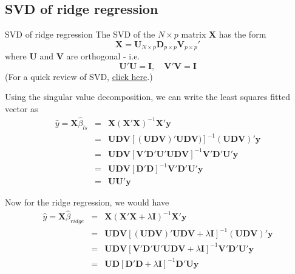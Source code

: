 \documentclass{beamer}
\newcommand{\X}{\bm{X}}
\newcommand{\y}{\bm{y}}
\begin{document}
\subsection{SVD of ridge regression}
\begin{frame}{SVD of ridge regression}
The SVD of the $N\times p$ matrix $\X$ has the form
\[
\X=\bm{U}_{N\times p}\bm{D}_{p\times p}\bm{V}_{p\times p}'
\]
where $\bm{U}$ and $\bm{V}$ are orthogonal - i.e. 
\[
\bm{U}'\bm{U}=\bm{I},\quad \bm{V}'\bm{V}=\bm{I}
\]
(For a quick review of SVD, \href{https://mathworld.wolfram.com/SingularValueDecomposition.html}{click here}.)

Using the singular value decomposition, we can write the least squares fitted vector as 
\begin{eqnarray*}
\hat{y}=\X\hat{\beta}_{ls}&=&\X(\X'\X)^{-1}\X'\y\\
&=&\bm{UDV}[(\bm{UDV})'\bm{UDV})]^{-1}(\bm{UDV})'\y\\
&=&\bm{UDV}[\bm{V}'\bm{D}'\bm{U}'\bm{UDV}]^{-1}\bm{V}'\bm{D}'\bm{U}'\y\\
&=&\bm{UDV}[\bm{D}'\bm{D}]^{-1}\bm{V'}\bm{D'}\bm{U'}\y\\
&=&\bm{UU}'\y
\end{eqnarray*}
\end{frame}

\begin{frame}
Now for the ridge regression, we would have
\begin{eqnarray*}
\hat{y}=\X\hat{\beta}_{ridge}&=&\X(\X'\X+\lambda\bm{I})^{-1}\X'\y\\
&=&\bm{UDV}[(\bm{UDV})'\bm{UDV}+\lambda\bm{I}]^{-1}(\bm{UDV})'\y\\
&=&\bm{UDV}[\bm{V}'\bm{D}'\bm{U}'\bm{UDV}+\lambda\bm{I}]^{-1}\bm{V}'\bm{D}'\bm{U}'\y\\
&=&\bm{U}\bm{D}[\bm{D}'\bm{D}+\lambda\bm{I}]^{-1}\bm{D}'\bm{U}\y
\end{eqnarray*}
\end{frame}
%
%
\end{document}
